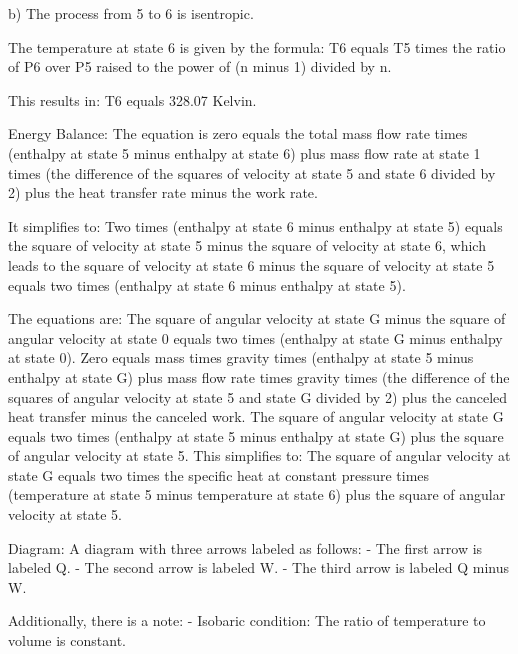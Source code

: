 b) The process from 5 to 6 is isentropic.

The temperature at state 6 is given by the formula:
T6 equals T5 times the ratio of P6 over P5 raised to the power of (n minus 1) divided by n.

This results in:
T6 equals 328.07 Kelvin.

Energy Balance:
The equation is zero equals the total mass flow rate times (enthalpy at state 5 minus enthalpy at state 6) plus mass flow rate at state 1 times (the difference of the squares of velocity at state 5 and state 6 divided by 2) plus the heat transfer rate minus the work rate.

It simplifies to:
Two times (enthalpy at state 6 minus enthalpy at state 5) equals the square of velocity at state 5 minus the square of velocity at state 6, which leads to the square of velocity at state 6 minus the square of velocity at state 5 equals two times (enthalpy at state 6 minus enthalpy at state 5).

The equations are:
The square of angular velocity at state G minus the square of angular velocity at state 0 equals two times (enthalpy at state G minus enthalpy at state 0).
Zero equals mass times gravity times (enthalpy at state 5 minus enthalpy at state G) plus mass flow rate times gravity times (the difference of the squares of angular velocity at state 5 and state G divided by 2) plus the canceled heat transfer minus the canceled work.
The square of angular velocity at state G equals two times (enthalpy at state 5 minus enthalpy at state G) plus the square of angular velocity at state 5.
This simplifies to:
The square of angular velocity at state G equals two times the specific heat at constant pressure times (temperature at state 5 minus temperature at state 6) plus the square of angular velocity at state 5.

Diagram: A diagram with three arrows labeled as follows:
- The first arrow is labeled Q.
- The second arrow is labeled W.
- The third arrow is labeled Q minus W.

Additionally, there is a note:
- Isobaric condition: The ratio of temperature to volume is constant.